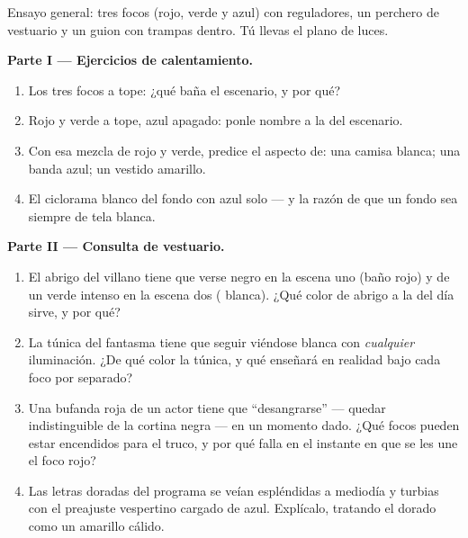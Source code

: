 \begin{problem}\label{pb:g8:colors-spectra:1}
Ensayo general: tres focos (rojo, verde y azul) con reguladores, un
perchero de vestuario y un guion con trampas dentro. Tú llevas el plano
de luces.

\medskip\noindent\textbf{Parte I --- Ejercicios de calentamiento.}
\begin{enumerate}
  \item Los tres focos a tope: ¿qué  baña el escenario, y por
        qué?
  \item Rojo y verde a tope, azul apagado: ponle nombre a la
         del escenario.
  \item Con esa mezcla de rojo y verde, predice el aspecto de: una
        camisa blanca; una banda azul; un vestido amarillo.
  \item El ciclorama blanco del fondo con azul solo --- y la razón de
        que un fondo sea siempre de tela blanca.
\end{enumerate}

\medskip\noindent\textbf{Parte II --- Consulta de vestuario.}
\begin{enumerate}[resume]
  \item El abrigo del villano tiene que verse negro en la escena uno
        (baño rojo) y de un verde intenso en la escena dos
        ( blanca). ¿Qué color de abrigo a la  del día
        sirve, y por qué?
  \item La túnica del fantasma tiene que seguir viéndose blanca con
        \emph{cualquier} iluminación. ¿De qué color la túnica, y qué
        enseñará en realidad bajo cada foco por separado?
  \item Una bufanda roja de un actor tiene que ``desangrarse'' ---
        quedar indistinguible de la cortina negra --- en un momento
        dado. ¿Qué focos pueden estar encendidos para el truco, y por
        qué falla en el instante en que se les une el foco rojo?
  \item Las letras doradas del programa se veían espléndidas a
        mediodía y turbias con el preajuste vespertino cargado de
        azul. Explícalo, tratando el dorado como un amarillo cálido.
\end{enumerate}


\end{problem}
